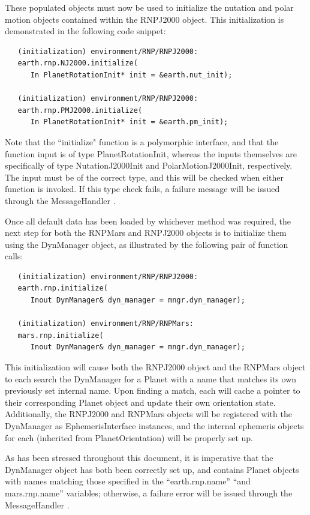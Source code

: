 These populated objects must now be used to initialize the nutation and
polar motion objects contained within the RNPJ2000 object. This initialization
is demonstrated in the following code snippet:

\begin{verbatim}
   (initialization) environment/RNP/RNPJ2000:
   earth.rnp.NJ2000.initialize(
      In PlanetRotationInit* init = &earth.nut_init);
 
   (initialization) environment/RNP/RNPJ2000:
   earth.rnp.PMJ2000.initialize(
      In PlanetRotationInit* init = &earth.pm_init);
\end{verbatim}

Note that the ``initialize" function is a polymorphic interface, and that
the function input is of type PlanetRotationInit, whereas the inputs themselves
are specifically of type NutationJ2000Init and PolarMotionJ2000Init, 
respectively. The input must be of the correct type, and this will be checked
when either function is invoked. If this type check fails, a failure
message will be issued through the MessageHandler \cite{dynenv:MESSAGE}.

Once all default data has been loaded by whichever method was required, the
next step for both the RNPMars and RNPJ2000 objects is to initialize them
using the DynManager object, as illustrated by the following pair of
function calls:

\begin{verbatim}
   (initialization) environment/RNP/RNPJ2000:
   earth.rnp.initialize(
      Inout DynManager& dyn_manager = mngr.dyn_manager);

   (initialization) environment/RNP/RNPMars:
   mars.rnp.initialize(
      Inout DynManager& dyn_manager = mngr.dyn_manager);
\end{verbatim}

This initialization will cause both the RNPJ2000 object and the RNPMars object
to each search the DynManager for a Planet with a name that matches its
own previously set internal name. Upon finding a match, each will
cache a pointer to their corresponding Planet object and update their own
orientation state. Additionally, the RNPJ2000 and RNPMars objects will be
registered with the DynManager as EphemerisInterface instances, and the
internal ephemeris objects for each (inherited from PlanetOrientation)
will be properly set up.

As has been stressed
throughout this document, it is imperative that the DynManager object has both
been correctly set up, and contains Planet objects with names matching those
specified in the ``earth.rnp.name'' ``and mars.rnp.name'' variables;
otherwise, a failure error will be issued through the MessageHandler
\cite{dynenv:MESSAGE}.

